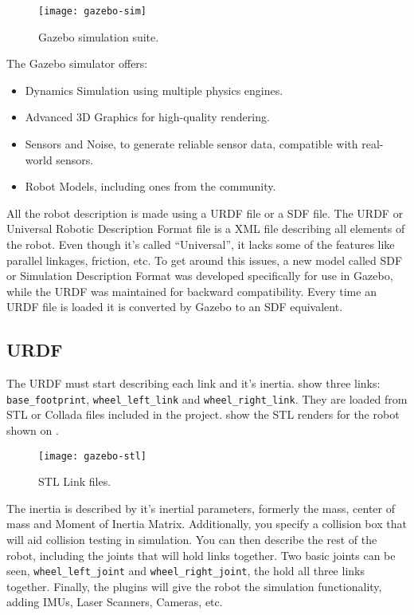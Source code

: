 \begin{figure}[!ht]
\centering
\texttt{[image: gazebo-sim]}
\caption{Gazebo simulation suite.}
\label{fig:gazebo-sim}
\end{figure}

The Gazebo simulator offers:

\begin{itemize}
\item Dynamics Simulation using multiple physics engines.
\item Advanced 3D Graphics for high-quality rendering.
\item Sensors and Noise, to generate reliable sensor data, compatible with real-world sensors.
\item Robot Models, including ones from the community.
\end{itemize}

All the robot description is made using a URDF file or a SDF file. The URDF or Universal Robotic Description Format file is a XML file describing all elements of the robot. Even though it's called ``Universal'', it lacks some of the features like parallel linkages, friction, etc. To get around this issues, a new model called SDF or  Simulation Description Format was developed specifically for use in Gazebo, while the URDF was maintained for backward compatibility. Every time an URDF file is loaded it is converted by Gazebo to an SDF equivalent.

\subsection{URDF}

The URDF must start describing each link and it's inertia.   show three links: \texttt{base\_footprint}, \texttt{wheel\_left\_link} and \texttt{wheel\_right\_link}. They are loaded from STL or Collada files included in the project.  show the STL renders for the robot shown on .

\begin{figure}[!ht]
\centering
\texttt{[image: gazebo-stl]}
\caption{STL Link files.}
\label{fig:gazebo-stl}
\end{figure}

The inertia is described by it's inertial parameters, formerly the mass, center of mass and Moment of Inertia Matrix. Additionally, you specify a collision box that will aid collision testing in simulation. You can then describe the rest of the robot, including the joints that will hold links together. Two basic joints can be seen, \texttt{wheel\_left\_joint} and \texttt{wheel\_right\_joint}, the hold all three links together. Finally, the plugins will give the robot the simulation functionality, adding IMUs, Laser Scanners, Cameras, etc.

